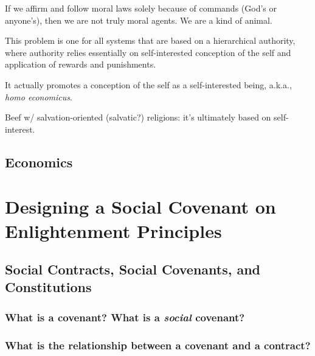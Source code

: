 \documentclass[
]{book}
\begin{document}
If we affirm and follow moral laws solely because of commands (God's or anyone's), then we are not truly moral agents. We are a kind of animal.

This problem is one for all systems that are based on a hierarchical authority, where authority relies essentially on self-interested conception of the self and application of rewards and punishments.

It actually promotes a conception of the self as a self-interested being, a.k.a., \emph{homo economicus}.

Beef w/ salvation-oriented (salvatic?) religions: it's ultimately based on self-interest.

\hypertarget{economics}{%
\chapter{Economics}\label{economics}}

\hypertarget{part-designing-a-social-covenant-on-enlightenment-principles}{%
\part{Designing a Social Covenant on Enlightenment Principles}\label{part-designing-a-social-covenant-on-enlightenment-principles}}

\hypertarget{social-contracts-social-covenants-and-constitutions}{%
\chapter{Social Contracts, Social Covenants, and Constitutions}\label{social-contracts-social-covenants-and-constitutions}}

\hypertarget{what-is-a-covenant-what-is-a-social-covenant}{%
\section{\texorpdfstring{What is a covenant? What is a \emph{social} covenant?}{What is a covenant? What is a social covenant?}}\label{what-is-a-covenant-what-is-a-social-covenant}}

\hypertarget{what-is-the-relationship-between-a-covenant-and-a-contract}{%
\section{What is the relationship between a covenant and a contract?}\label{what-is-the-relationship-between-a-covenant-and-a-contract}}
\end{document}
